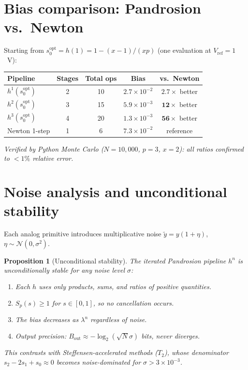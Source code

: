 \documentclass[10pt,a4paper,oneside]{book}
\newtheorem{proposition}[theorem]{Proposition}
\theoremstyle{definition}
\theoremstyle{remark}
\begin{document}
\section{Bias comparison: Pandrosion vs.\ Newton}

Starting from $s_0^{\mathrm{opt}} = h(1) = 1 - (x-1)/(xp)$ (one evaluation at $V_{\mathrm{ref}} = 1$~V):

\begin{center}
\renewcommand{\arraystretch}{1.2}
\begin{tabular}{lcccc}
\toprule
\textbf{Pipeline} & \textbf{Stages} & \textbf{Total ops} & \textbf{Bias} & \textbf{vs.\ Newton} \\
\midrule
$h^1(s_0^{\mathrm{opt}})$ & 2 & 10 & $2.7 \times 10^{-2}$ & $\mathbf{2.7\times}$ better \\
$h^2(s_0^{\mathrm{opt}})$ & 3 & 15 & $5.9 \times 10^{-3}$ & $\mathbf{12\times}$ better \\
$h^3(s_0^{\mathrm{opt}})$ & 4 & 20 & $1.3 \times 10^{-3}$ & $\mathbf{56\times}$ better \\
\midrule
Newton 1-step & 1 & 6 & $7.3 \times 10^{-2}$ & reference \\
\bottomrule
\end{tabular}
\end{center}

\emph{Verified by Python Monte Carlo ($N = 10{,}000$, $p = 3$, $x = 2$): all ratios confirmed to $< 1\%$ relative error.}

\section{Noise analysis and unconditional stability}

Each analog primitive introduces multiplicative noise $\tilde{y} = y(1 + \eta)$, $\eta \sim \mathcal{N}(0, \sigma^2)$.

\begin{proposition}[Unconditional stability]
The iterated Pandrosion pipeline $h^n$ is unconditionally stable for any noise level $\sigma$:
\begin{enumerate}[nosep]
\item Each $h$ uses only products, sums, and ratios of \emph{positive} quantities.
\item $S_p(s) \geq 1$ for $s \in [0,1]$, so no cancellation occurs.
\item The bias decreases as $\lambda^n$ regardless of noise.
\item Output precision: $B_{\mathrm{out}} \approx -\log_2(\sqrt{N}\sigma)$ bits, never diverges.
\end{enumerate}
This contrasts with Steffensen-accelerated methods ($T_2$), whose denominator $s_2 - 2s_1 + s_0 \approx 0$ becomes noise-dominated for $\sigma > 3 \times 10^{-3}$.
\end{proposition}
\end{document}
